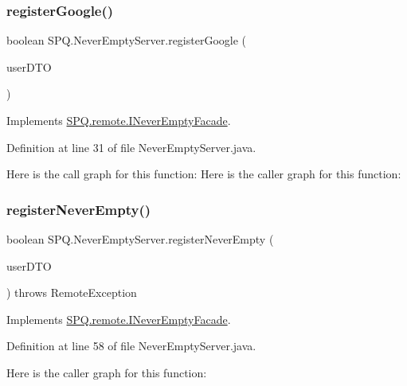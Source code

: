 \subsubsection{\texorpdfstring{register\+Google()}{registerGoogle()}}
{\footnotesize\ttfamily boolean S\+P\+Q.\+Never\+Empty\+Server.\+register\+Google (\begin{DoxyParamCaption}\item[{\mbox{\hyperlink{class_s_p_q_1_1dto_1_1_user_d_t_o}{User\+D\+TO}}}]{user\+D\+TO }\end{DoxyParamCaption})}



Implements \mbox{\hyperlink{interface_s_p_q_1_1remote_1_1_i_never_empty_facade_a93f3250c09a26fdb1d65219599dfd542}{S\+P\+Q.\+remote.\+I\+Never\+Empty\+Facade}}.



Definition at line 31 of file Never\+Empty\+Server.\+java.

Here is the call graph for this function\+:
Here is the caller graph for this function\+:
\mbox{\label{class_s_p_q_1_1_never_empty_server_ae52815c925e04018d6a1b2742d605063}} 
\subsubsection{\texorpdfstring{register\+Never\+Empty()}{registerNeverEmpty()}}
{\footnotesize\ttfamily boolean S\+P\+Q.\+Never\+Empty\+Server.\+register\+Never\+Empty (\begin{DoxyParamCaption}\item[{\mbox{\hyperlink{class_s_p_q_1_1dto_1_1_user_d_t_o}{User\+D\+TO}}}]{user\+D\+TO }\end{DoxyParamCaption}) throws Remote\+Exception}



Implements \mbox{\hyperlink{interface_s_p_q_1_1remote_1_1_i_never_empty_facade_a7867e1e698fea32a535a1daeda4e8d6a}{S\+P\+Q.\+remote.\+I\+Never\+Empty\+Facade}}.



Definition at line 58 of file Never\+Empty\+Server.\+java.

Here is the caller graph for this function\+:
\mbox{\label{class_s_p_q_1_1_never_empty_server_ad39f95ea2309841407f7e8b9e1b9f664}} 
